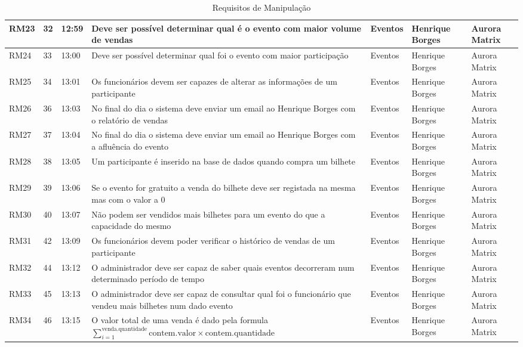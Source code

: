 \documentclass[a4paper,12pt]{scrreprt}
\begin{document}
\begin{table}[H]
{\begin{tabular}{|l|l|l|>{\raggedright\arraybackslash}p{12cm}|l|l|l|}
        RM23 & 32 & 12:59 & Deve ser possível determinar qual é o evento com maior volume de vendas & Eventos & Henrique Borges & Aurora Matrix \\ \hline
        RM24 & 33 & 13:00 & Deve ser possível determinar qual foi o evento com maior participação & Eventos & Henrique Borges & Aurora Matrix \\ \hline
        RM25 & 34 & 13:01 & Os funcionários devem ser capazes de alterar as informações de um participante & Eventos & Henrique Borges & Aurora Matrix \\ \hline
        RM26 & 36 & 13:03 & No final do dia o sistema deve enviar um email ao Henrique Borges com o relatório de vendas & Eventos & Henrique Borges & Aurora Matrix \\ \hline
        RM27 & 37 & 13:04 & No final do dia o sistema deve enviar um email ao Henrique Borges com a afluência do evento & Eventos & Henrique Borges & Aurora Matrix \\ \hline
        RM28 & 38 & 13:05 & Um participante é inserido na base de dados quando compra um bilhete & Eventos & Henrique Borges & Aurora Matrix \\ \hline
        RM29 & 39 & 13:06 & Se o evento for gratuito a venda do bilhete deve ser registada na mesma mas com o valor a 0 & Eventos & Henrique Borges & Aurora Matrix \\ \hline
        RM30 & 40 & 13:07 & Não podem ser vendidos mais bilhetes para um evento do que a capacidade do mesmo & Eventos & Henrique Borges & Aurora Matrix \\ \hline
        RM31 & 42 & 13:09 & Os funcionários devem poder verificar o histórico de vendas de um participante & Eventos & Henrique Borges & Aurora Matrix \\ \hline
        RM32 & 44 & 13:12 & O administrador deve ser capaz de saber quais eventos decorreram num determinado período de tempo & Eventos & Henrique Borges & Aurora Matrix \\ \hline
        RM33 & 45 & 13:13 & O administrador deve ser capaz de consultar qual foi o funcionário que vendeu mais bilhetes num dado evento & Eventos & Henrique Borges & Aurora Matrix \\ \hline
        RM34 & 46 & 13:15 & O valor total de uma venda é dado pela formula
        $\sum_{i=1}^{\text{venda.quantidade}} \text{contem.valor} \times \text{contem.quantidade}$ 
        & Eventos & Henrique Borges & Aurora Matrix \\ \hline
        
    \end{tabular}%
}
    \caption{Requisitos de Manipulação}
\end{table}
\end{document}
